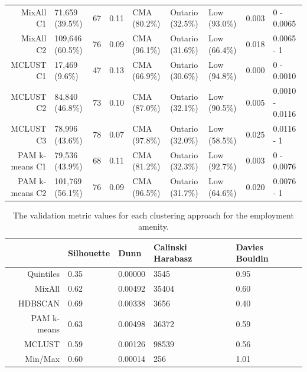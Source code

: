 \documentclass[11pt, a4paper]{article}
\begin{document}
\begin{table}[H]
{\begin{tabular}{|r|llllllll|}
  MixAll C1 & 71,659 (39.5\%) & 67 & 0.11 & CMA (80.2\%) & Ontario (32.5\%) & Low (93.0\%) & 0.003 & 0 - 0.0065 \\
  MixAll C2 & 109,646 (60.5\%) & 76 & 0.09 & CMA (96.1\%) & Ontario (31.6\%) & Low (66.4\%) & 0.018 & 0.0065 - 1 \\
\rowcolor{gray!25}  MCLUST C1 & 17,469 (9.6\%) & 47 & 0.13 & CMA (66.9\%) & Ontario (30.6\%) & Low (94.8\%) & 0.000 & 0 - 0.0010 \\
\rowcolor{gray!25}  MCLUST C2 & 84,840 (46.8\%) & 73 & 0.10 & CMA (87.0\%) & Ontario (32.1\%) & Low (90.5\%) & 0.005 & 0.0010 - 0.0116 \\
\rowcolor{gray!25}  MCLUST C3 & 78,996 (43.6\%) & 78 & 0.07 & CMA (97.8\%) & Ontario (32.0\%) & Low (58.5\%) & 0.025 & 0.0116 - 1 \\
  PAM k-means C1 & 79,536 (43.9\%) & 68 & 0.11 & CMA (81.2\%) & Ontario (32.3\%) & Low (92.7\%) & 0.003 & 0 - 0.0076 \\
  PAM k-means C2 & 101,769 (56.1\%) & 76 & 0.09 & CMA (96.5\%) & Ontario (31.7\%) & Low (64.6\%) & 0.020 & 0.0076 - 1 \\
   \hline
\end{tabular}
}
\end{table}








\pagebreak


\centering
\begin{longtable}[h]{|r|llll|}
\caption[Employment validation metrics]{The validation metric values for each clustering approach for the employment amenity.}\label{employmentvalid}
\endfirsthead
\endhead
  \hline
 & Silhouette & Dunn & Calinski Harabasz & Davies Bouldin \\
  \hline
Quintiles & 0.35 & 0.00000 &  3545 & 0.95 \\
   \hline
MixAll & 0.62 & 0.00492 & 35404 & 0.60 \\
   \hline
HDBSCAN & \cellcolor{gray!25} 0.69 & 0.00338 &  3656 & \cellcolor{gray!25} 0.40 \\
   \hline
PAM k-means & 0.63 & \cellcolor{gray!25} 0.00498 & 36372 & 0.59 \\
   \hline
MCLUST & 0.59 & 0.00126 & \cellcolor{gray!25} 98539 & 0.56 \\
   \hline
Min/Max & 0.60 & 0.00014 &   256 & 1.01 \\
   \hline
\end{longtable}
\end{document}
